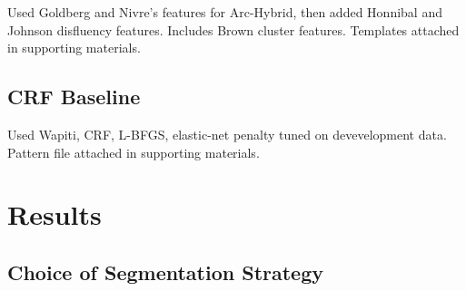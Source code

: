 \documentclass[11pt,letterpaper]{article}
\begin{document}
Used Goldberg and Nivre's features for Arc-Hybrid, then added Honnibal and Johnson
disfluency features. Includes Brown cluster features. Templates attached in 
supporting materials.

\subsection{CRF Baseline}

Used Wapiti, CRF, L-BFGS, elastic-net penalty tuned on devevelopment data.
Pattern file attached in supporting materials.
\clearpage

\section{Results}
\label{sec:results}
\subsection{Choice of Segmentation Strategy}
\end{document}
